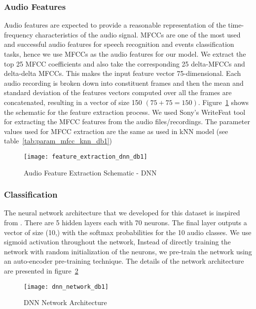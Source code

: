 \subsubsection{Audio Features}
Audio features are expected to provide a reasonable representation of the time-frequency characteristics of the audio signal. MFCCs are one of the most used and successful audio features for speech recognition and events classification tasks, hence we use MFCCs as the audio features for our model. We extract the top 25 MFCC coefficients and also take the corresponding 25 delta-MFCCs and delta-delta MFCCs. This makes the input feature vector 75-dimensional. Each audio recording is broken down into constituent frames and then the mean and standard deviation of the features vectors computed over all the frames are concatenated, resulting in a vector of size 150 $(75+75=150)$. Figure~\ref{fig:feature_extraction_dnn_db1} shows the schematic for the feature extraction process. We used Sony's WriteFeat tool for extracting the MFCC features from the audio files/recordings. The parameter values used for MFCC extraction are the same as used in kNN model (see table~\ref{tab:param_mfcc_knn_db1})

\begin{figure}[!htb] 
\centering 
\texttt{[image: feature\_extraction\_dnn\_db1]}
\caption[Audio Feature Extraction Schematic - DNN]{Audio Feature Extraction Schematic - DNN}
\label{fig:feature_extraction_dnn_db1} 
\end{figure}

\subsubsection{Classification}
The neural network architecture that we developed for this dataset is inspired from \cite{gencoglu2014recognition}. There are 5 hidden layers each with 70 neurons. The final layer outputs a vector of size (10,) with the softmax probabilities for the 10 audio classes. We use sigmoid activation throughout the network, Instead of directly training the network with random initialization of the neurons, we pre-train the network using an auto-encoder pre-training technique. The details of the network architecture are presented in figure~\ref{fig:dnn_network_db1}

\begin{figure}[!htb] 
\centering 
\texttt{[image: dnn\_network\_db1]}
\caption[DNN Network Architecture]{DNN Network Architecture}
\label{fig:dnn_network_db1} 
\end{figure}

